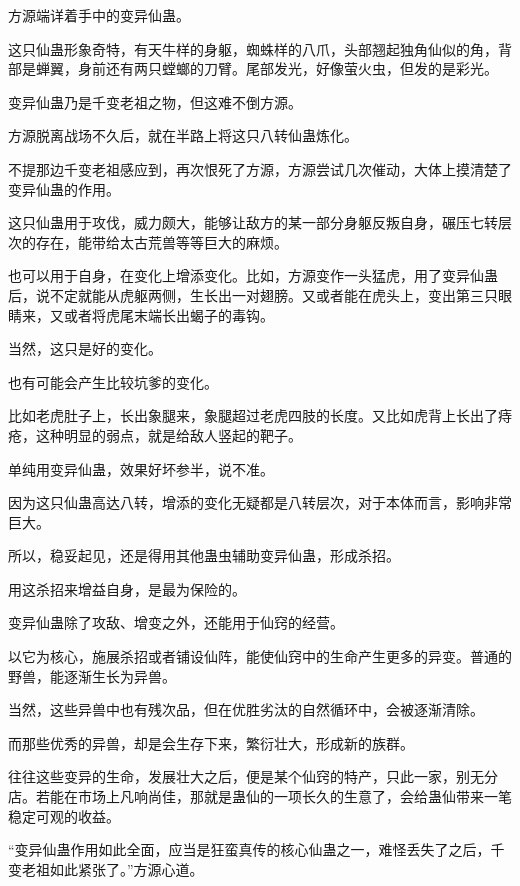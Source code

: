 
\begin{this_body}



方源端详着手中的变异仙蛊。

这只仙蛊形象奇特，有天牛样的身躯，蜘蛛样的八爪，头部翘起独角仙似的角，背部是蝉翼，身前还有两只螳螂的刀臂。尾部发光，好像萤火虫，但发的是彩光。

变异仙蛊乃是千变老祖之物，但这难不倒方源。

方源脱离战场不久后，就在半路上将这只八转仙蛊炼化。

不提那边千变老祖感应到，再次恨死了方源，方源尝试几次催动，大体上摸清楚了变异仙蛊的作用。

这只仙蛊用于攻伐，威力颇大，能够让敌方的某一部分身躯反叛自身，碾压七转层次的存在，能带给太古荒兽等等巨大的麻烦。

也可以用于自身，在变化上增添变化。比如，方源变作一头猛虎，用了变异仙蛊后，说不定就能从虎躯两侧，生长出一对翅膀。又或者能在虎头上，变出第三只眼睛来，又或者将虎尾末端长出蝎子的毒钩。

当然，这只是好的变化。

也有可能会产生比较坑爹的变化。

比如老虎肚子上，长出象腿来，象腿超过老虎四肢的长度。又比如虎背上长出了痔疮，这种明显的弱点，就是给敌人竖起的靶子。

单纯用变异仙蛊，效果好坏参半，说不准。

因为这只仙蛊高达八转，增添的变化无疑都是八转层次，对于本体而言，影响非常巨大。

所以，稳妥起见，还是得用其他蛊虫辅助变异仙蛊，形成杀招。

用这杀招来增益自身，是最为保险的。

变异仙蛊除了攻敌、增变之外，还能用于仙窍的经营。

以它为核心，施展杀招或者铺设仙阵，能使仙窍中的生命产生更多的异变。普通的野兽，能逐渐生长为异兽。

当然，这些异兽中也有残次品，但在优胜劣汰的自然循环中，会被逐渐清除。

而那些优秀的异兽，却是会生存下来，繁衍壮大，形成新的族群。

往往这些变异的生命，发展壮大之后，便是某个仙窍的特产，只此一家，别无分店。若能在市场上凡响尚佳，那就是蛊仙的一项长久的生意了，会给蛊仙带来一笔稳定可观的收益。

“变异仙蛊作用如此全面，应当是狂蛮真传的核心仙蛊之一，难怪丢失了之后，千变老祖如此紧张了。”方源心道。


\end{this_body}
